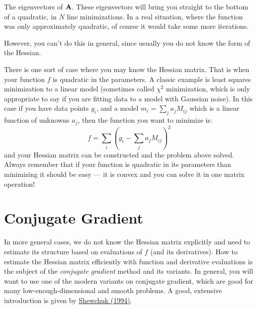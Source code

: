 
\begin{answer}
The eigenvectors of ${\bf A}$. These eigenvectors will bring you
straight to the bottom of a quadratic, in $N$ line minimizations. In a
real situation, where the function was only approximately quadratic,
of course it would take some more iterations.

However, you can't do this in general, since usually you do not know
the form of the Hessian.
\end{answer}

There is one sort of case where you may know the Hessian matrix. That
is when your function $f$ is quadratic in the parameters. A classic
example is least squares minimization to a linear model (sometimes
called $\chi^2$ minimization, which is only appropriate to say if you
are fitting data to a model with Gaussian noise). In this case if you
have data points $g_i$, and a model $m_i = \sum_j a_j M_{ij}$ which is
a linear function of unknowns $a_j$, then the function you want to
minimize is:
\begin{equation}
f = \sum_i \left( g_i - \sum_{j} a_j M_{ij} \right)^2
\end{equation}
and your Hessian matrix can be constructed and the problem above
solved. Always remember that if your function is quadratic in its
parameters than minimizing it should be easy --- it is convex and you
can solve it in one matrix operation!

\section{Conjugate Gradient}

In more general cases, we do not know the Hessian matrix explicitly
and need to estimate its structure based on evaluations of $f$ (and
its derivatives). How to estimate the Hessian matrix efficiently with 
function and derivative evaluations is the subject of the {\it
  conjugate gradient} method and its variants. In general, you will
want to use one of the modern variants on conjugate gradient, which
are good for many low-enough-dimensional and smooth problems. A good,
extensive introduction is given by
\href{http://www.cs.cmu.edu/~jrs/jrspapers.html}{\color{red} Shewchuk
  (1994)}.

